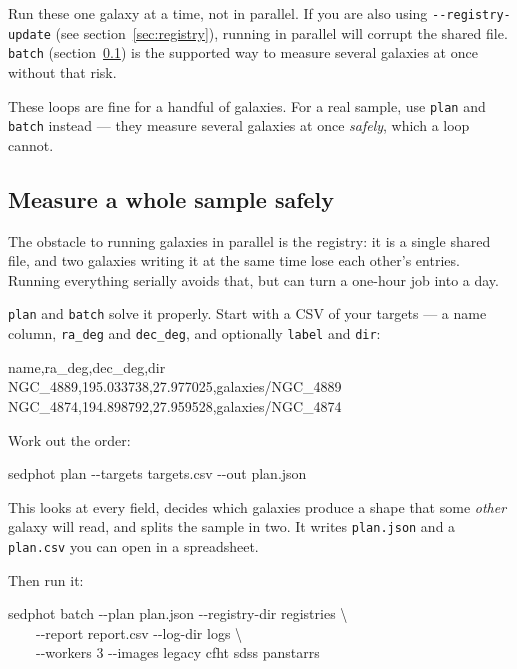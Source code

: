 \documentclass[11pt]{article}
\newcommand{\cmdline}[1]{\begin{cmd}\ttfamily #1\end{cmd}}
\begin{document}
\begin{warnbox}
Run these one galaxy at a time, not in parallel. If you are also using
\texttt{-{}-registry-update} (see section~\ref{sec:registry}), running in
parallel will corrupt the shared file. \texttt{batch}
(section~\ref{sec:sweep}) is the supported way to measure several galaxies
at once without that risk.
\end{warnbox}

These loops are fine for a handful of galaxies. For a real sample, use
\texttt{plan} and \texttt{batch} instead --- they measure several galaxies
at once \emph{safely}, which a loop cannot.

\subsection{Measure a whole sample safely}
\label{sec:sweep}

The obstacle to running galaxies in parallel is the registry: it is a single
shared file, and two galaxies writing it at the same time lose each other's
entries. Running everything serially avoids that, but can turn a one-hour
job into a day.

\texttt{plan} and \texttt{batch} solve it properly. Start with a CSV of your
targets --- a name column, \texttt{ra\_deg} and \texttt{dec\_deg}, and
optionally \texttt{label} and \texttt{dir}:

\begin{cmd}\ttfamily\frenchspacing
name,ra\_deg,dec\_deg,dir\\
NGC\_4889,195.033738,27.977025,galaxies/NGC\_4889\\
NGC\_4874,194.898792,27.959528,galaxies/NGC\_4874
\end{cmd}

Work out the order:

\cmdline{sedphot plan -{}-targets targets.csv -{}-out plan.json}

This looks at every field, decides which galaxies produce a shape that some
\emph{other} galaxy will read, and splits the sample in two. It writes
\texttt{plan.json} and a \texttt{plan.csv} you can open in a spreadsheet.

Then run it:

\begin{cmd}\ttfamily\frenchspacing
sedphot batch -{}-plan plan.json -{}-registry-dir registries \textbackslash\\
\mbox{}~~~~-{}-report report.csv -{}-log-dir logs \textbackslash\\
\mbox{}~~~~-{}-workers 3 -{}-images legacy cfht sdss panstarrs
\end{cmd}
\end{document}
